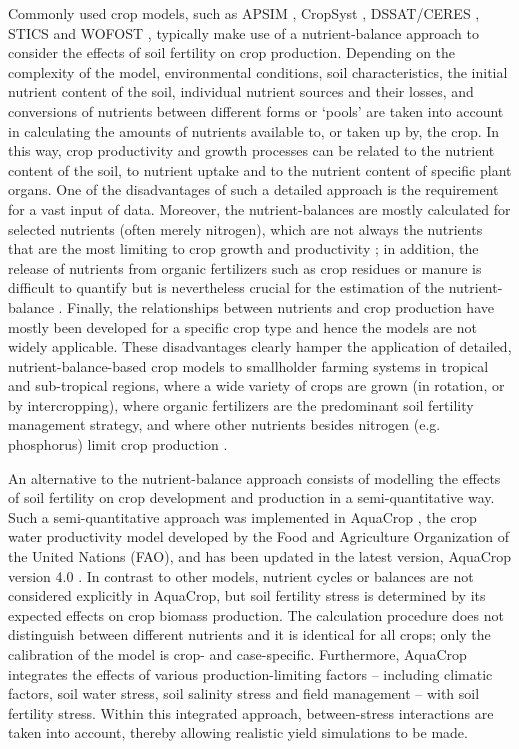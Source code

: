 Commonly used crop models, such as APSIM \parencite{keating2003}, CropSyst \parencite{stockle2003}, DSSAT/CERES \parencite{jones2003}, STICS \parencite{brisson2003} and WOFOST \parencite{boogaard2014}, typically make use of a nutrient-balance approach to consider the effects of soil fertility on crop production. Depending on the complexity of the model, environmental conditions, soil characteristics, the initial nutrient content of the soil, individual nutrient sources and their losses, and conversions of nutrients between different forms or `pools' are taken into account in calculating the amounts of nutrients available to, or taken up by, the crop. In this way, crop productivity and growth processes can be related to the nutrient content of the soil, to nutrient uptake and to the nutrient content of specific plant organs. One of the disadvantages of such a detailed approach is the requirement for a vast input of data. Moreover, the nutrient-balances are mostly calculated for selected nutrients (often merely nitrogen), which are not always the nutrients that are the most limiting to crop growth and productivity \parencite{probert2000,probert2004,brisson2003}; in addition, the release of nutrients from organic fertilizers such as crop residues or manure is difficult to quantify but is nevertheless crucial for the estimation of the nutrient-balance \parencite{probert2004a,gijsman2002}. Finally, the relationships between nutrients and crop production have mostly been developed for a specific crop type and hence the models are not widely applicable. These disadvantages clearly hamper the application of detailed, nutrient-balance-based crop models to smallholder farming systems in tropical and sub-tropical regions, where a wide variety of crops are grown (in rotation, or by intercropping), where organic fertilizers are the predominant soil fertility management strategy, and where other nutrients besides nitrogen (e.g. phosphorus) limit crop production \parencite{delve2009,whitbread2010}. 

An alternative to the nutrient-balance approach consists of modelling the effects of soil fertility on crop development and production in a semi-quantitative way. Such a semi-quantitative approach was implemented in AquaCrop \parencite{hsiao2009,steduto2009,raes2009a,vanuytrecht2014a}, the crop water productivity model developed by the Food and Agriculture Organization of the United Nations (FAO), and has been updated in the latest version, AquaCrop version 4.0 \parencite{raes2012}. In contrast to other models, nutrient cycles or balances are not considered explicitly in AquaCrop, but soil fertility stress is determined by its expected effects on crop biomass production. The calculation procedure does not distinguish between different nutrients and it is identical for all crops; only the calibration of the model is crop- and case-specific. Furthermore, AquaCrop integrates the effects of various production-limiting factors – including climatic factors, soil water stress, soil salinity stress and field management – with soil fertility stress. Within this integrated approach, between-stress interactions are taken into account, thereby allowing realistic yield simulations to be made.

